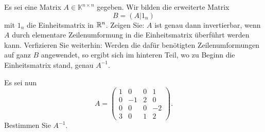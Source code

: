 \begin{Problem}
	\begin{parts}	
	\item Es sei eine Matrix $A \in \mathbb{K}^{n\times n}$ gegeben. Wir bilden die erweiterte Matrix
	\[
		B=(A|1_n)\]
		mit $1_n$ die Einheitsmatrix in $\mathbb{R}^n$. Zeigen Sie: $A$ ist genau dann invertierbar, wenn $A$ durch elementare Zeilenumformung in die Einheitsmatrix überführt werden kann. Verfizieren Sie weiterhin: Werden die dafür benötigten Zeilenumformungen auf ganz $B$ angewendet, so ergibt sich im hinteren Teil, wo zu Beginn die Einheitsmatrix stand, genau $A^{-1}$.
	\item Es sei nun
		\[
			A=\begin{pmatrix} 1 & 0 & 0 & 1\\0 & -1 & 2 & 0 \\ 0 & 0 & 0 & -2\\3 & 0 & 1 & 2 \end{pmatrix} 
		.\] 
		Bestimmen Sie $A^{-1}$.
	\end{parts}
\end{Problem}

